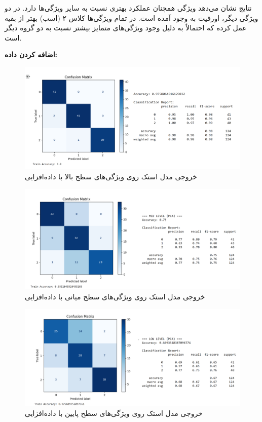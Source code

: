 \documentclass[a4paper,12pt]{article}
\begin{document}
\vspace{0.3cm}

نتایج نشان می‌دهد ویژگی  همچنان عملکرد بهتری نسبت به سایر ویژگی‌ها دارد. در دو ویژگی دیگر، اورفیت به وجود آمده است. در تمام ویژگی‌ها کلاس ۲ (اسب) بهتر از بقیه عمل کرده که احتمالاً به دلیل وجود ویژگی‌های متمایز بیشتر نسبت به دو گروه دیگر است.

\textbf{اضافه کردن داده:}

\begin{figure}[H]
	\centering
	\includegraphics[width=1\textwidth]{2-high.png}
	\caption*{خروجی مدل استک روی ویژگی‌های سطح بالا با داده‌افزایی}
\end{figure}
\FloatBarrier
\begin{figure}[H]
	\centering
	\includegraphics[width=1\textwidth]{2-mid.png}
	\caption*{خروجی مدل استک روی ویژگی‌های سطح میانی با داده‌افزایی}
\end{figure}
\FloatBarrier
\begin{figure}[H]
	\centering
	\includegraphics[width=1\textwidth]{2-low.png}
	\caption*{خروجی مدل استک روی ویژگی‌های سطح پایین با داده‌افزایی}
\end{figure}
\FloatBarrier
\end{document}
